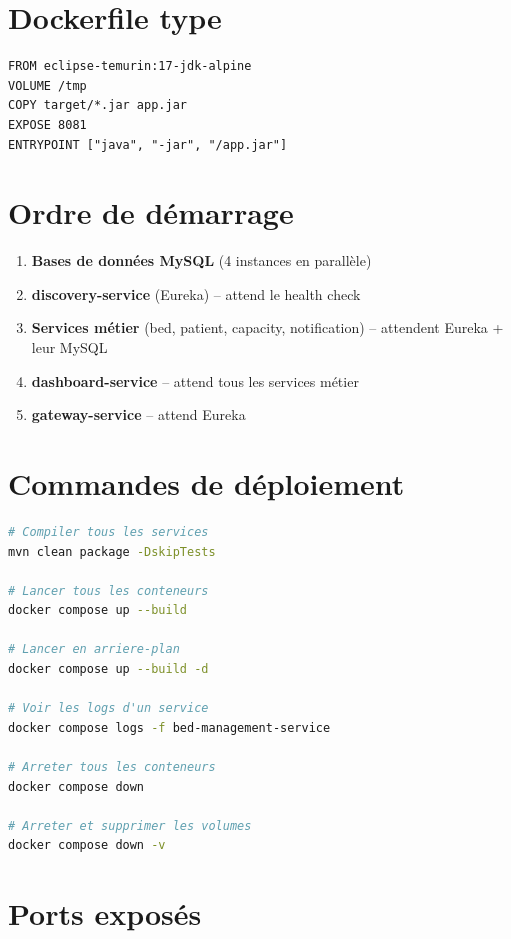\documentclass[12pt,a4paper]{report}
\begin{document}
\section{Dockerfile type}

\begin{lstlisting}[caption={Dockerfile d'un microservice}]
FROM eclipse-temurin:17-jdk-alpine
VOLUME /tmp
COPY target/*.jar app.jar
EXPOSE 8081
ENTRYPOINT ["java", "-jar", "/app.jar"]
\end{lstlisting}

\section{Ordre de d\'emarrage}

\begin{enumerate}
    \item \textbf{Bases de donn\'ees MySQL} (4 instances en parall\`ele)
    \item \textbf{discovery-service} (Eureka) -- attend le health check
    \item \textbf{Services m\'etier} (bed, patient, capacity, notification) -- attendent Eureka + leur MySQL
    \item \textbf{dashboard-service} -- attend tous les services m\'etier
    \item \textbf{gateway-service} -- attend Eureka
\end{enumerate}

\section{Commandes de d\'eploiement}

\begin{lstlisting}[language=bash, caption={Commandes pour d\'eployer le syst\`eme}]
# Compiler tous les services
mvn clean package -DskipTests

# Lancer tous les conteneurs
docker compose up --build

# Lancer en arriere-plan
docker compose up --build -d

# Voir les logs d'un service
docker compose logs -f bed-management-service

# Arreter tous les conteneurs
docker compose down

# Arreter et supprimer les volumes
docker compose down -v
\end{lstlisting}

\section{Ports expos\'es}
\end{document}
